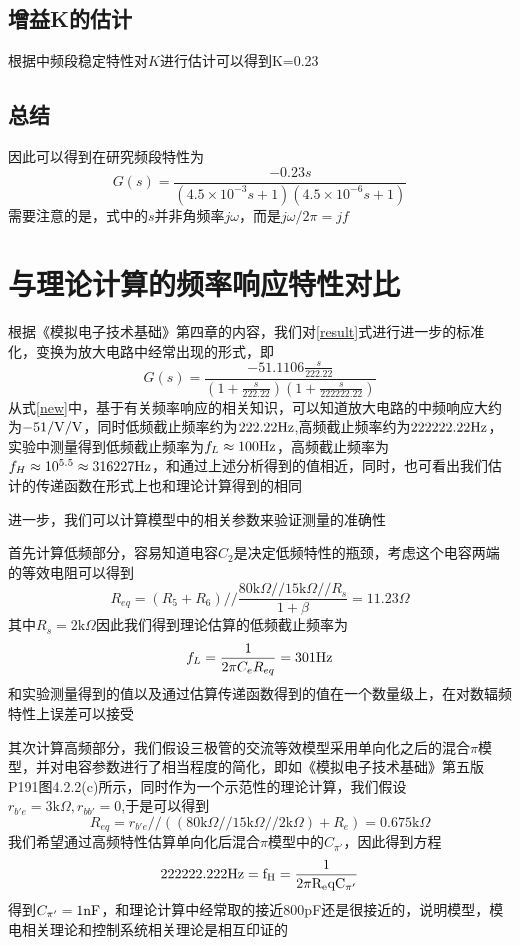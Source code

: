 \documentclass[UTF8,a4paper]{paper}
\begin{document}
\subsection{增益K的估计}
根据中频段稳定特性对$K$进行估计可以得到K=0.23
\subsection{总结}
因此可以得到在研究频段特性为
\begin{equation}
G(s)=\frac{-0.23s}{(4.5\times10^{-3}s+1)(4.5\times10^{-6}s+1)}
\label{result}
\end{equation}
需要注意的是，式中的$s$并非角频率$j\omega$，而是$j\omega/2\pi=jf$
\section{与理论计算的频率响应特性对比}
根据《模拟电子技术基础》第四章的内容，我们对\ref{result}式进行进一步的标准化，变换为放大电路中经常出现的形式，即
\begin{equation}
G(s)=\frac{-51.1106\frac{s}{222.22}}{(1+\frac{s}{222.22})(1+\frac{s}{222222.22})}
\label{new}
\end{equation}
从式\ref{new}中，基于有关频率响应的相关知识，可以知道放大电路的中频响应大约为$-51/\rm{V/V}$，同时低频截止频率约为$222.22\rm{Hz}$,高频截止频率约为$222222.22\rm{Hz}$，实验中测量得到低频截止频率为$f_L\approx100\rm{Hz}$，高频截止频率为$f_H\approx10^{5.5}\approx316227\rm{Hz}$，和通过上述分析得到的值相近，同时，也可看出我们估计的传递函数在形式上也和理论计算得到的相同

进一步，我们可以计算模型中的相关参数来验证测量的准确性

首先计算低频部分，容易知道电容$C_2$是决定低频特性的瓶颈，考虑这个电容两端的等效电阻可以得到
\begin{equation}
R_{eq}=(R_5+R_6) // \frac{80\mathrm{k}\Omega // 15 \mathrm{k}\Omega//R_s}{1+\beta} = 11.23\Omega
\end{equation}
其中$R_s=2\mathrm{k}\Omega$因此我们得到理论估算的低频截止频率为
\begin{equation}
f_L=\frac{1}{2\pi C_eR_{eq}}=301\rm{Hz}
\end{equation}
和实验测量得到的值以及通过估算传递函数得到的值在一个数量级上，在对数辐频特性上误差可以接受

其次计算高频部分，我们假设三极管的交流等效模型采用单向化之后的混合$\pi$模型，并对电容参数进行了相当程度的简化，即如《模拟电子技术基础》第五版P191图4.2.2(c)所示，同时作为一个示范性的理论计算，我们假设$r_{b'e}=3\mathrm{k}\Omega,r_{bb'}=0$,于是可以得到
\begin{equation}
R_{eq}=r_{b'e}//((80\mathrm{k}\Omega//15\mathrm{k}\Omega//2\mathrm{k}\Omega)+R_e)=0.675\mathrm{k}\Omega
\end{equation}
我们希望通过高频特性估算单向化后混合$\pi$模型中的$C_{\pi '}$，因此得到方程
\begin{equation}
222222.222\rm{Hz}=f_H=\frac{1}{2\pi R_eqC_{\pi '}}
\end{equation}
得到$C_{\pi '}=1\rm{nF}$，和理论计算中经常取的接近800pF还是很接近的，说明模型，模电相关理论和控制系统相关理论是相互印证的
\end{document}
